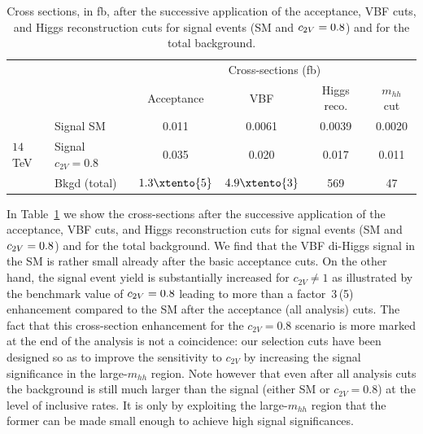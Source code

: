 \begin{table}[h]\centering
	\small
	\renewcommand{\arraystretch}{1.5}
	\begin{tabular}{llcccc}
	  \toprule[0.1em]
          & & \multicolumn{4}{c}{Cross-sections (fb) } \\
	&  &  Acceptance & VBF  & Higgs reco. & $m_{hh}$ cut  \\\midrule 
		\multirow{3}{*}{	{\large $14\,$TeV}} 
		& Signal SM &  0.011 & 0.0061 & 0.0039 & 0.0020 \\
		& Signal $c_{2V}=0.8$ & 0.035 & 0.020 & 0.017 & 0.011 \\
		 & Bkgd (total)   & $1.3\xtento{5}$ & $4.9\xtento{3}$ & 569 & 47   \\
                \bottomrule[0.1em]
         \end{tabular} 
        \caption{\small Cross sections, in fb, after the
successive application of the acceptance, VBF cuts, and Higgs reconstruction cuts
for signal events (SM and  $c_{2V}=0.8$) and for
the total background. \label{tab:xsecs}
}
\end{table}

In Table~\ref{tab:xsecs} we show the cross-sections after the
successive application of the acceptance, VBF cuts, and Higgs reconstruction cuts
for signal events (SM and  $c_{2V}=0.8$) and for
the total background. We find that the VBF di-Higgs signal in the SM is rather small
already after the basic acceptance cuts. On the other hand, the signal event
yield is substantially increased for $c_{2V}\ne 1$ as illustrated by the
benchmark value of $c_{2V} = 0.8$ leading to more than a factor~3\,(5) enhancement
compared to the SM after the acceptance (all analysis) cuts. The fact that this
cross-section enhancement for the $c_{2V} = 0.8$ scenario is more marked at the
end of the analysis is not a coincidence: our selection cuts have been designed
so as to improve the sensitivity to $c_{2V}$ by increasing the signal
significance in the large-$m_{hh}$ region.
Note however that even after
all analysis cuts the background is still much larger than the signal (either SM
or $c_{2V}=0.8$) at the level of inclusive rates. It is only by exploiting  the
large-$m_{hh}$ region that the former can be made small enough to achieve high
signal significances.

